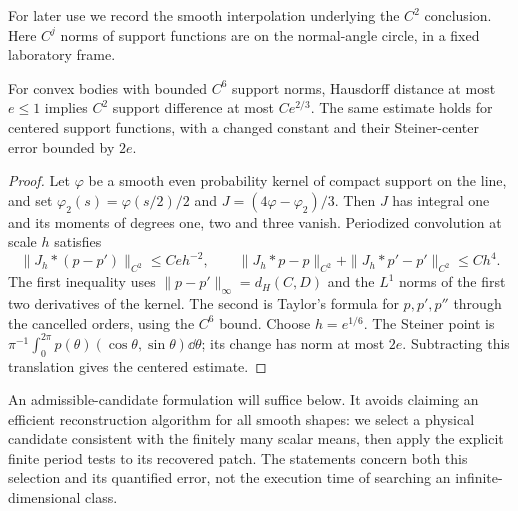 For later use we record the smooth interpolation underlying the
$C^2$ conclusion. Here $C^j$ norms of support functions are on the
normal-angle circle, in a fixed laboratory frame.
\begin{lemma}
\label{lem:smoothing}
For convex bodies with bounded $C^6$ support norms, Hausdorff distance
at most $e\le1$ implies $C^2$ support difference at most $C e^{2/3}$.
The same estimate holds for centered support functions, with a changed
constant and their Steiner-center error bounded by $2e$.
\end{lemma}
\begin{proof}
Let $\varphi$ be a smooth even probability kernel of compact support
on the line, and set $\varphi_2(s)=\varphi(s/2)/2$ and
$J=(4\varphi-\varphi_2)/3$. Then $J$ has integral one and its moments
of degrees one, two and three vanish. Periodized convolution at scale
$h$ satisfies
\[
 \|J_h*(p-p')\|_{C^2}\le Ceh^{-2},\qquad
 \|J_h*p-p\|_{C^2}+\|J_h*p'-p'\|_{C^2}\le C h^4.
\]
The first inequality uses $\|p-p'\|_\infty=d_H(C,D)$ and the $L^1$
norms of the first two derivatives of the kernel. The second is Taylor's
formula for $p,p',p''$ through the cancelled orders, using the $C^6$
bound. Choose $h=e^{1/6}$. The Steiner point is
$\pi^{-1}\int_0^{2\pi}p(\theta)(\cos\theta,\sin\theta)\dd\theta$;
its change has norm at most $2e$. Subtracting this translation gives
the centered estimate.
\end{proof}

An admissible-candidate formulation will suffice below. It avoids
claiming an efficient reconstruction algorithm for all smooth shapes:
we select a physical candidate consistent with the finitely many scalar
means, then apply the explicit finite period tests to its recovered
patch. The statements concern both this selection and its quantified
error, not the execution time of searching an infinite-dimensional class.
